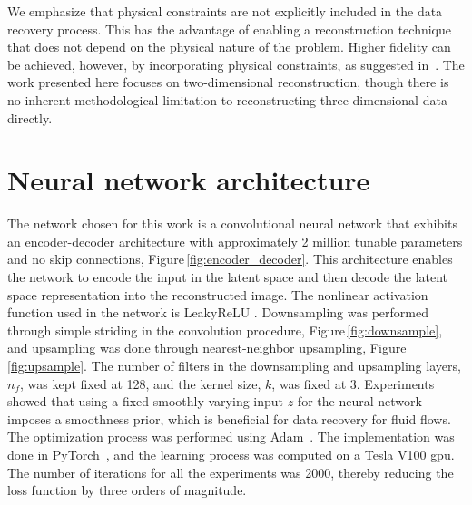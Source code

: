 \documentclass[review]{elsarticle}
\begin{document}
We emphasize that physical constraints are not explicitly included in
the data recovery process. This has the advantage of enabling a
reconstruction technique that does not depend on the physical nature
of the problem. Higher fidelity can be achieved, however, by
incorporating physical constraints, as suggested in~\cite{Raissi2017,
  Sirignano2018}. The work presented here focuses on two-dimensional
reconstruction, though there is no inherent methodological limitation
to reconstructing three-dimensional data directly.

\section{Neural network architecture}\label{sec:nn}

The network chosen for this work is a convolutional neural network
that exhibits an encoder-decoder architecture with approximately 2
million tunable parameters and no skip connections,
Figure\,\ref{fig:encoder_decoder}. This architecture enables the
network to encode the input in the latent space and then decode the
latent space representation into the reconstructed image. The
nonlinear activation function used in the network is LeakyReLU
\cite{He2015}. Downsampling was performed through simple striding in
the convolution procedure, Figure\,\ref{fig:downsample}, and
upsampling was done through nearest-neighbor upsampling,
Figure\,\ref{fig:upsample}. The number of filters in the downsampling
and upsampling layers, $n_f$, was kept fixed at 128, and the kernel
size, $k$, was fixed at 3. Experiments showed that using a fixed
smoothly varying input $z$ for the neural network imposes a smoothness
prior, which is beneficial for data recovery for fluid flows. The
optimization process was performed using Adam~\cite{Kingma2014}. The
implementation was done in PyTorch~\cite{Paszke2017}, and the learning
process was computed on a Tesla V100 \acrlong{gpu}. The number of
iterations for all the experiments was 2000, thereby reducing
the loss function by three orders of magnitude.
\end{document}
